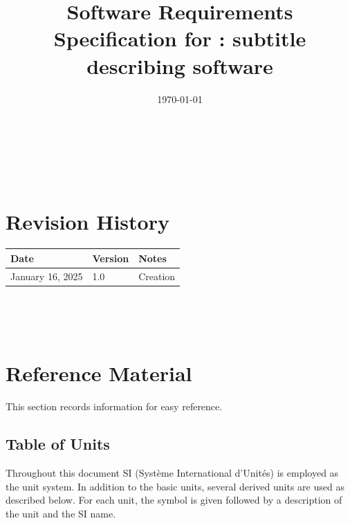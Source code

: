 \documentclass[12pt]{article}
\begin{document}
\title{Software Requirements Specification for \progname: subtitle describing software} 
\author{\authname}
\date{\today}
	
\maketitle

~\newpage


\tableofcontents

~\newpage

\section*{Revision History}

\begin{tabularx}{\textwidth}{p{3cm}p{2cm}X} \toprule {\bf Date} & {\bf Version}
& {\bf Notes}\\
\midrule
January 16, 2025 & 1.0 & Creation\\
\bottomrule
\end{tabularx}

~\\

~\newpage

\section{Reference Material}

This section records information for easy reference.

\subsection{Table of Units}

Throughout this document SI (Syst\`{e}me International d'Unit\'{e}s) is employed
as the unit system.  In addition to the basic units, several derived units are
used as described below.  For each unit, the symbol is given followed by a
description of the unit and the SI name.  ~\newline
\end{document}
